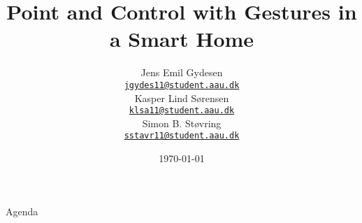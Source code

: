 \documentclass[10pt]{beamer}
\title{Point and Control with Gestures in a Smart Home}
\date{\today}
\author{
  Jens Emil Gydesen\\ \href{mailto:jgydes11@student.aau.dk}{{\tt jgydes11@student.aau.dk}}\\
  Kasper Lind Sørensen\\ \href{mailto:klsa11@student.aau.dk}{{\tt klsa11@student.aau.dk}}\\
  Simon B. Støvring\\ \href{mailto:sstavr11@student.aau.dk}{{\tt sstavr11@student.aau.dk}}
}
\institute[
  Dept.\ of Computer Science\\
  Aalborg University\\
  Denmark
] %
{%
  Department of Computer Science\\
  Aalborg University\\
  Denmark
  
}
\begin{document}
{\aauwavesbg%
\begin{frame} %
  \titlepage
\end{frame}}

\begin{frame}{Agenda}{}
\tableofcontents
\end{frame}

%
%
%
%
%
%



\end{document}
